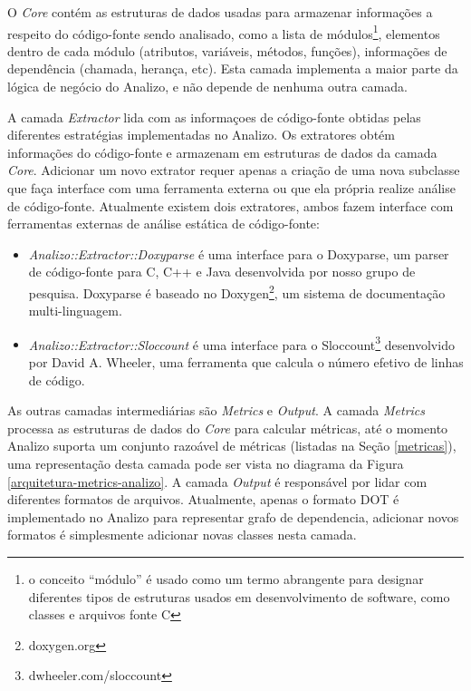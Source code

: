 O {\it Core} contém as estruturas de dados usadas para armazenar informações a
respeito do código-fonte sendo analisado, como a lista de módulos\footnote{o
conceito ``módulo'' é usado como um termo abrangente para designar diferentes
tipos de estruturas usados em desenvolvimento de software, como classes e
arquivos fonte C}, elementos dentro de cada módulo (atributos, variáveis,
métodos, funções), informações de dependência (chamada, herança, etc). Esta
camada implementa a maior parte da lógica de negócio do Analizo, e não depende
de nenhuma outra camada.

A camada {\it Extractor} lida com as informaçoes de código-fonte obtidas pelas
diferentes estratégias implementadas no Analizo. Os extratores obtém
informações do código-fonte e armazenam em estruturas de dados da camada {\it
Core}. Adicionar um novo extrator requer apenas a criação de uma nova subclasse
que faça interface com uma ferramenta externa ou que ela própria realize análise
de código-fonte. Atualmente existem dois extratores, ambos fazem interface
com ferramentas externas de análise estática de código-fonte:

\begin{itemize}

  \item {\it Analizo::Extractor::Doxyparse} é uma interface para o Doxyparse,
  um parser de código-fonte para C, C++ e Java desenvolvida por nosso grupo de
  pesquisa\cite{Costa2009}. Doxyparse é baseado no
  Doxygen\footnote{doxygen.org}, um sistema de documentação multi-linguagem.

  \item {\it Analizo::Extractor::Sloccount} é uma interface para o
  Sloccount\footnote{dwheeler.com/sloccount} desenvolvido por David A. Wheeler,
  uma ferramenta que calcula o número efetivo de linhas de código.

\end{itemize}

As outras camadas intermediárias são {\it Metrics} e {\it Output}. A camada
{\it Metrics} processa as estruturas de dados do {\it Core} para calcular
métricas, até o momento Analizo suporta um conjunto razoável de métricas
(listadas na Seção \ref{metricas}), uma representação desta camada pode ser
vista no diagrama da Figura \ref{arquitetura-metrics-analizo}. A camada {\it
Output} é responsável por lidar com diferentes formatos de arquivos.
Atualmente, apenas o formato DOT é implementado no Analizo para representar
grafo de dependencia, adicionar novos formatos é simplesmente adicionar novas
classes nesta camada.

